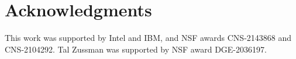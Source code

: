 \section{Acknowledgments}
This work was supported by Intel and IBM, and NSF awards CNS-2143868 and CNS-2104292.
Tal Zussman was supported by NSF award DGE-2036197.
